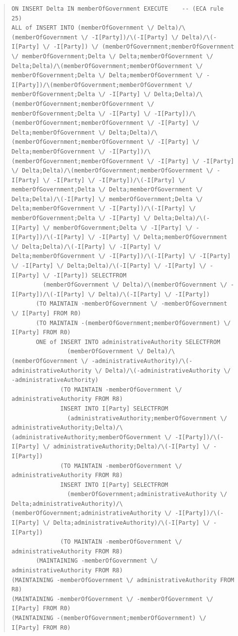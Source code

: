 \documentclass[10pt,a4paper]{report}              %
\theoremstyle{plain}\theorembodyfont{\rmfamily}\newtheorem{definition}{Definition}[section]
\theoremstyle{plain}\theorembodyfont{\rmfamily}\newtheorem{designrule}[definition]{Requirement}
\begin{document}
\begin{quote}
\begin{verbatim}
ON INSERT Delta IN memberOfGovernment EXECUTE    -- (ECA rule 25)
ALL of INSERT INTO (memberOfGovernment \/ Delta)/\(memberOfGovernment \/ -I[Party])/\(-I[Party] \/ Delta)/\(-I[Party] \/ -I[Party]) \/ (memberOfGovernment;memberOfGovernment \/ memberOfGovernment;Delta \/ Delta;memberOfGovernment \/ Delta;Delta)/\(memberOfGovernment;memberOfGovernment \/ memberOfGovernment;Delta \/ Delta;memberOfGovernment \/ -I[Party])/\(memberOfGovernment;memberOfGovernment \/ memberOfGovernment;Delta \/ -I[Party] \/ Delta;Delta)/\(memberOfGovernment;memberOfGovernment \/ memberOfGovernment;Delta \/ -I[Party] \/ -I[Party])/\(memberOfGovernment;memberOfGovernment \/ -I[Party] \/ Delta;memberOfGovernment \/ Delta;Delta)/\(memberOfGovernment;memberOfGovernment \/ -I[Party] \/ Delta;memberOfGovernment \/ -I[Party])/\(memberOfGovernment;memberOfGovernment \/ -I[Party] \/ -I[Party] \/ Delta;Delta)/\(memberOfGovernment;memberOfGovernment \/ -I[Party] \/ -I[Party] \/ -I[Party])/\(-I[Party] \/ memberOfGovernment;Delta \/ Delta;memberOfGovernment \/ Delta;Delta)/\(-I[Party] \/ memberOfGovernment;Delta \/ Delta;memberOfGovernment \/ -I[Party])/\(-I[Party] \/ memberOfGovernment;Delta \/ -I[Party] \/ Delta;Delta)/\(-I[Party] \/ memberOfGovernment;Delta \/ -I[Party] \/ -I[Party])/\(-I[Party] \/ -I[Party] \/ Delta;memberOfGovernment \/ Delta;Delta)/\(-I[Party] \/ -I[Party] \/ Delta;memberOfGovernment \/ -I[Party])/\(-I[Party] \/ -I[Party] \/ -I[Party] \/ Delta;Delta)/\(-I[Party] \/ -I[Party] \/ -I[Party] \/ -I[Party]) SELECTFROM
         (memberOfGovernment \/ Delta)/\(memberOfGovernment \/ -I[Party])/\(-I[Party] \/ Delta)/\(-I[Party] \/ -I[Party])
       (TO MAINTAIN -memberOfGovernment \/ -memberOfGovernment \/ I[Party] FROM R0)
       (TO MAINTAIN -(memberOfGovernment;memberOfGovernment) \/ I[Party] FROM R0)
       ONE of INSERT INTO administrativeAuthority SELECTFROM
                (memberOfGovernment \/ Delta)/\(memberOfGovernment \/ -administrativeAuthority)/\(-administrativeAuthority \/ Delta)/\(-administrativeAuthority \/ -administrativeAuthority)
              (TO MAINTAIN -memberOfGovernment \/ administrativeAuthority FROM R8)
              INSERT INTO I[Party] SELECTFROM
                (administrativeAuthority;memberOfGovernment \/ administrativeAuthority;Delta)/\(administrativeAuthority;memberOfGovernment \/ -I[Party])/\(-I[Party] \/ administrativeAuthority;Delta)/\(-I[Party] \/ -I[Party])
              (TO MAINTAIN -memberOfGovernment \/ administrativeAuthority FROM R8)
              INSERT INTO I[Party] SELECTFROM
                (memberOfGovernment;administrativeAuthority \/ Delta;administrativeAuthority)/\(memberOfGovernment;administrativeAuthority \/ -I[Party])/\(-I[Party] \/ Delta;administrativeAuthority)/\(-I[Party] \/ -I[Party])
              (TO MAINTAIN -memberOfGovernment \/ administrativeAuthority FROM R8)
       (MAINTAINING -memberOfGovernment \/ administrativeAuthority FROM R8)
(MAINTAINING -memberOfGovernment \/ administrativeAuthority FROM R8)
(MAINTAINING -memberOfGovernment \/ -memberOfGovernment \/ I[Party] FROM R0)
(MAINTAINING -(memberOfGovernment;memberOfGovernment) \/ I[Party] FROM R0)
\end{verbatim}
\end{quote}
\end{document}
